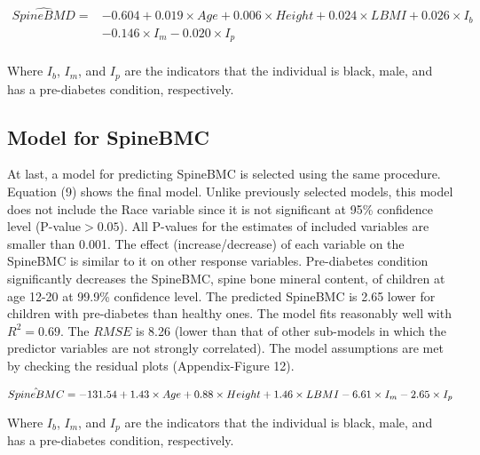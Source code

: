 \documentclass[11pt]{article}
\begin{document}
\begin{equation}
\begin{split}
\hat{SpineBMD} = &-0.604 +0.019\times Age +0.006\times Height +0.024\times LBMI + 0.026\times I_b\\& -0.146\times I_m -0.020\times I_p\\
\end{split}
\end{equation}

Where $I_b$, $I_m$, and $I_p$ are the indicators that the individual is black, male, and has a pre-diabetes condition, respectively.

\subsection{Model for SpineBMC}
At last, a model for predicting SpineBMC is selected using the same procedure. Equation (9) shows the final model. Unlike previously selected models, this model does not include the Race variable since it is not significant at 95\% confidence level (P-value$>0.05$). All P-values for the estimates of included variables are smaller than 0.001. The effect (increase/decrease) of each variable on the SpineBMC is similar to it on other response variables. Pre-diabetes condition significantly decreases the SpineBMC, spine bone mineral content, of children at age 12-20 at 99.9\% confidence level. The predicted SpineBMC is 2.65 lower for children with pre-diabetes than healthy ones. The model fits reasonably well with $R^2=0.69$. The $RMSE$ is 8.26 (lower than that of other sub-models in which the predictor variables are not strongly correlated). The model assumptions are met by checking the residual plots (Appendix-Figure 12).  

\begin{equation}
\hat{SpineBMC} = -131.54 +1.43\times Age +0.88\times Height +1.46\times LBMI -6.61\times I_m -2.65\times I_p\\
\end{equation}

Where $I_b$, $I_m$, and $I_p$ are the indicators that the individual is black, male, and has a pre-diabetes condition, respectively.
			
\end{document}
